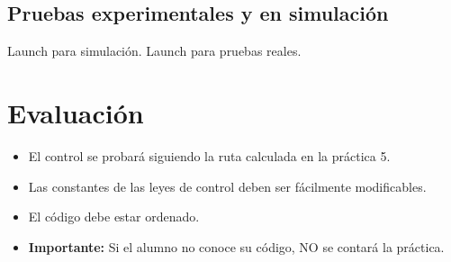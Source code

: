 \documentclass[letterpaper,12pt]{article}
\begin{document}
\subsection{Pruebas experimentales y en simulación}
Launch para simulación. Launch para pruebas reales.

\section{Evaluación}
\begin{itemize}
\item El control se probará siguiendo la ruta calculada en la práctica 5. 
\item Las constantes de las leyes de control deben ser fácilmente modificables. 
\item El código debe estar ordenado.
\item \textbf{Importante: } Si el alumno no conoce su código, NO se contará la práctica.
\end{itemize}
\end{document}
